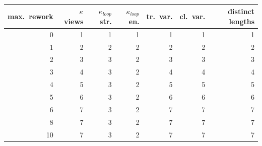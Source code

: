 \begin{tabular}{rrrrrrr}
\toprule
max.\ rework & $\kappa$ views & $\kappa_{\mathit{loop}}$ str. & $\kappa_{\mathit{loop}}$ en. & tr.\ var. & cl.\ var. & distinct lengths \\
\midrule
0 & 1 & 1 & 1 & 1 & 1 & 1 \\
1 & 2 & 2 & 2 & 2 & 2 & 2 \\
2 & 3 & 3 & 2 & 3 & 3 & 3 \\
3 & 4 & 3 & 2 & 4 & 4 & 4 \\
4 & 5 & 3 & 2 & 5 & 5 & 5 \\
5 & 6 & 3 & 2 & 6 & 6 & 6 \\
6 & 7 & 3 & 2 & 7 & 7 & 7 \\
8 & 7 & 3 & 2 & 7 & 7 & 7 \\
10 & 7 & 3 & 2 & 7 & 7 & 7 \\
\bottomrule
\end{tabular}
